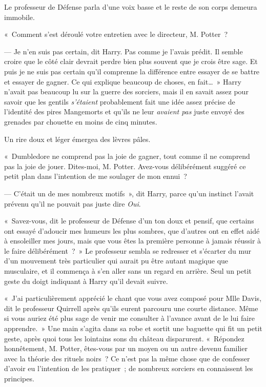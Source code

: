Le professeur de Défense parla d'une voix basse et le reste de son corps demeura immobile.

«~Comment s'est déroulé votre entretien avec le directeur, M. Potter~?

--- Je n'en suis pas certain, dit Harry. Pas comme je l'avais prédit. Il semble croire que le côté clair devrait perdre bien plus souvent que je crois être sage. Et puis je ne suis pas certain qu'il comprenne la différence entre essayer de se battre et essayer de gagner. Ce qui explique beaucoup de choses, en fait…~» Harry n'avait pas beaucoup lu sur la guerre des sorciers, mais il en savait assez pour savoir que les gentils \emph{s'étaient} probablement fait une idée assez précise de l'identité des pires Mangemorts et qu'ils ne leur \emph{avaient pas} juste envoyé des grenades par chouette en moins de cinq minutes.

Un rire doux et léger émergea des lèvres pâles.

«~Dumbledore ne comprend pas la joie de gagner, tout comme il ne comprend pas la joie de jouer. Dites-moi, M. Potter. Avez-vous délibérément suggéré ce petit plan dans l'intention de me soulager de mon ennui~?

--- C'était un de mes nombreux motifs~», dit Harry, parce qu'un instinct l'avait prévenu qu'il ne pouvait pas juste dire \emph{Oui}.

«~Savez-vous, dit le professeur de Défense d'un ton doux et pensif, que certains ont essayé d'adoucir mes humeurs les plus sombres, que d'autres ont en effet aidé à ensoleiller mes jours, mais que vous êtes la première personne à jamais réussir à le faire délibérément~?~» Le professeur sembla se redresser et s'écarter du mur d'un mouvement très particulier qui aurait pu être autant magique que musculaire, et il commença à s'en aller sans un regard en arrière. Seul un petit geste du doigt indiquant à Harry qu'il devait suivre.

«~J'ai particulièrement apprécié le chant que vous avez composé pour Mlle Davis, dit le professeur Quirrell après qu'ils eurent parcouru une courte distance. Même si vous auriez été plus sage de venir me consulter à l'avance avant de le lui faire apprendre.~» Une main s'agita dans sa robe et sortit une baguette qui fit un petit geste, après quoi tous les lointains sons du château disparurent. «~Répondez honnêtement, M. Potter, êtes-vous par un moyen ou un autre devenu familier avec la théorie des rituels noirs~? Ce n'est pas la même chose que de confesser d'avoir eu l'intention de les pratiquer~; de nombreux sorciers en connaissent les principes.

